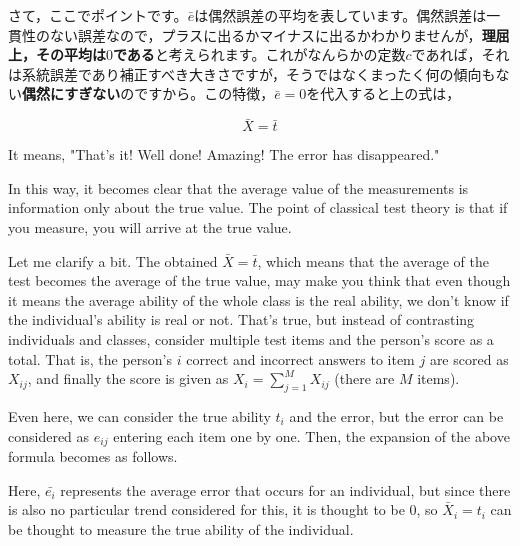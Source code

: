 \documentclass{ltjbook}
\begin{document}
さて，ここでポイントです。$\bar{e}$は偶然誤差の平均を表しています。偶然誤差は一貫性のない誤差なので，プラスに出るかマイナスに出るかわかりませんが，\textbf{理屈上，その平均は$0$である}と考えられます。これがなんらかの定数$c$であれば，それは系統誤差であり補正すべき大きさですが，そうではなくまったく何の傾向もない\textbf{偶然にすぎない}のですから。この特徴，$\bar{e}=0$を代入すると上の式は，

\[ \bar{X} = \bar{t} \]

It means, "That's it! Well done! Amazing! The error has disappeared."

In this way, it becomes clear that the average value of the measurements is information only about the true value. The point of classical test theory is that if you measure, you will arrive at the true value.

Let me clarify a bit.
The obtained $\bar{X} = \bar{t}$, which means that the average of the test becomes the average of the true value, may make you think that even though it means the average ability of the whole class is the real ability, we don't know if the individual's ability is real or not. That's true, but instead of contrasting individuals and classes, consider multiple test items and the person's score as a total. That is, the person's $i$ correct and incorrect answers to item $j$ are scored as $X_{ij}$, and finally the score is given as $X_i = \sum_{j=1}^M X_{ij}$ (there are $M$ items).

Even here, we can consider the true ability $t_i$ and the error, but the error can be considered as $e_{ij}$ entering each item one by one. Then, the expansion of the above formula becomes as follows.

Here, $\bar{e_i}$ represents the average error that occurs for an individual, but since there is also no particular trend considered for this, it is thought to be $0$, so $\bar{X}_i = t_i $ can be thought to measure the true ability of the individual.
\end{document}
